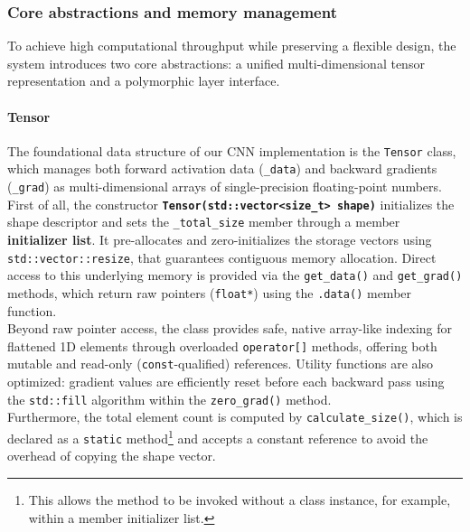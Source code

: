 \subsubsection{Core abstractions and memory management}

To achieve high computational throughput while preserving a flexible design, the system introduces two core abstractions: a unified multi-dimensional tensor representation and a polymorphic layer interface.

\paragraph{Tensor}

The foundational data structure of our CNN implementation is the \texttt{Tensor} class, which manages both forward activation data (\texttt{\_data}) and backward gradients (\texttt{\_grad}) as multi-dimensional arrays of single-precision floating-point numbers.\\

First of all, the constructor \textbf{\texttt{Tensor(std::vector<size\_t> shape)}} initializes the shape descriptor and sets the \texttt{\_total\_size} member through a member \textbf{initializer list}. It pre-allocates and zero-initializes the storage vectors using \texttt{std::vector::resize}, that guarantees contiguous memory allocation. Direct access to this underlying memory is provided via the \texttt{get\_data()} and \texttt{get\_grad()} methods, which return raw pointers (\texttt{float*}) using the \texttt{.data()} member function.\\

Beyond raw pointer access, the class provides safe, native array-like indexing for flattened 1D elements through overloaded \texttt{operator[]} methods, offering both mutable and read-only (\texttt{const}-qualified) references. Utility functions are also optimized: gradient values are efficiently reset before each backward pass using the \texttt{std::fill} algorithm within the \texttt{zero\_grad()} method.\\

Furthermore, the total element count is computed by \texttt{calculate\_size()}, which is declared as a \texttt{static} method\footnote{This allows the method to be invoked without a class instance, for example, within a member initializer list.} and accepts a constant reference to avoid the overhead of copying the shape vector.\\

